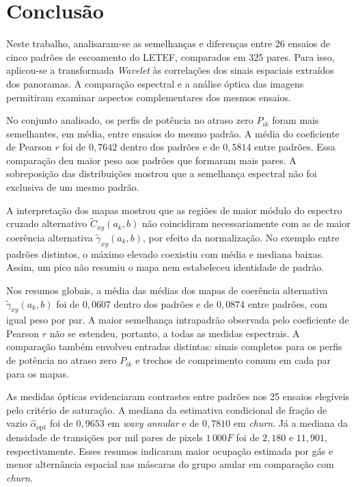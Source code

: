 \chapter{Conclusão}\label{cap:conclusao}

Neste trabalho, analisaram-se as semelhanças e diferenças entre 26 ensaios de cinco
padrões de escoamento do LETEF, comparados em 325 pares. Para isso, aplicou-se
a transformada \textit{Wavelet} às correlações dos sinais espaciais extraídos
dos panoramas. A comparação espectral e a análise óptica das imagens
permitiram examinar aspectos complementares dos mesmos ensaios.

No conjunto analisado, os perfis de potência no atraso zero
$P_{ik}$ foram mais semelhantes, em média, entre ensaios do mesmo padrão.
A média do coeficiente de Pearson $r$ foi de $0{,}7642$ dentro dos padrões
e de $0{,}5814$ entre padrões. Essa comparação deu maior peso aos padrões
que formaram mais pares. A sobreposição das distribuições mostrou que
a semelhança espectral não foi exclusiva de um mesmo padrão.

A interpretação dos mapas mostrou que as regiões de maior módulo do
espectro cruzado alternativo $\widetilde C_{xy}(a_k,b)$ não coincidiram
necessariamente com as de maior coerência alternativa
$\widetilde\gamma_{xy}(a_k,b)$, por efeito da normalização.
No exemplo entre padrões distintos, o máximo
elevado coexistiu com média e mediana baixas. Assim, um pico não resumiu
o mapa nem estabeleceu identidade de padrão.

Nos resumos globais, a média das médias dos mapas de coerência alternativa
$\widetilde\gamma_{xy}(a_k,b)$ foi de $0{,}0607$ dentro dos padrões e de
$0{,}0874$ entre padrões, com igual peso por par. A maior semelhança
intrapadrão observada pelo coeficiente de Pearson $r$ não se estendeu,
portanto, a todas as medidas espectrais. A comparação também envolveu
entradas distintas: sinais completos para os perfis de potência no atraso
zero $P_{ik}$ e trechos de comprimento comum em cada par para os mapas.

As medidas ópticas evidenciaram contrastes entre padrões nos 25 ensaios
elegíveis pelo critério de saturação. A mediana da estimativa condicional
de fração de vazio $\widehat\alpha_{\mathrm{opt}}$ foi de $0{,}9653$ em
\textit{wavy annular} e de $0{,}7810$ em \textit{churn}. Já a mediana da
densidade de transições por mil pares de pixels $1\,000F$ foi de $2{,}180$
e $11{,}901$, respectivamente. Esses resumos indicaram maior ocupação
estimada por gás e menor alternância espacial nas máscaras do grupo anular
em comparação com \textit{churn}.

